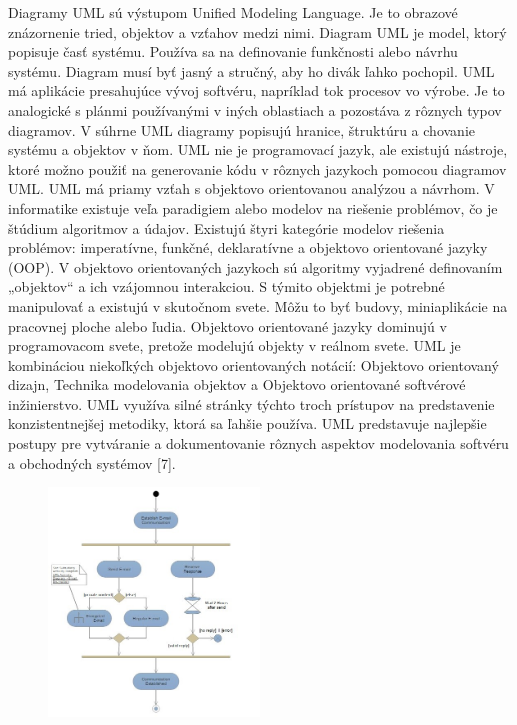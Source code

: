 \documentclass[a4paper]{feidippp}
\begin{document}
Diagramy UML sú výstupom Unified Modeling Language. Je to obrazové znázornenie tried, objektov a vzťahov medzi nimi. Diagram UML je model, ktorý popisuje časť systému. Používa sa na definovanie funkčnosti alebo návrhu systému. Diagram musí byť jasný a stručný, aby ho divák ľahko pochopil. UML má aplikácie presahujúce vývoj softvéru, napríklad tok procesov vo výrobe. Je to analogické s plánmi používanými v iných oblastiach a pozostáva z rôznych typov diagramov. V súhrne UML diagramy popisujú hranice, štruktúru a chovanie systému a objektov v ňom. UML nie je programovací jazyk, ale existujú nástroje, ktoré možno použiť na generovanie kódu v rôznych jazykoch pomocou diagramov UML. UML má priamy vzťah s objektovo orientovanou analýzou a návrhom. V informatike existuje veľa paradigiem alebo modelov na riešenie problémov, čo je štúdium algoritmov a údajov. Existujú štyri kategórie modelov riešenia problémov: imperatívne, funkčné, deklaratívne a objektovo orientované jazyky (OOP). V objektovo orientovaných jazykoch sú algoritmy vyjadrené definovaním „objektov“ a ich vzájomnou interakciou. S týmito objektmi je potrebné manipulovať a existujú v skutočnom svete. Môžu to byť budovy, miniaplikácie na pracovnej ploche alebo ľudia.  
Objektovo orientované jazyky dominujú v programovacom svete, pretože modelujú objekty v reálnom svete. UML je kombináciou niekoľkých objektovo orientovaných notácií: Objektovo orientovaný dizajn, Technika modelovania objektov a Objektovo orientované softvérové inžinierstvo. UML využíva silné stránky týchto troch prístupov na predstavenie konzistentnejšej metodiky, ktorá sa ľahšie používa. UML predstavuje najlepšie postupy pre vytváranie a dokumentovanie rôznych aspektov modelovania softvéru a obchodných systémov [7]. 



\begin{figure}[!ht]
\centering 
\includegraphics[width=0.5\textwidth]{dp4.jpg}
\end{figure}
\end{document}
